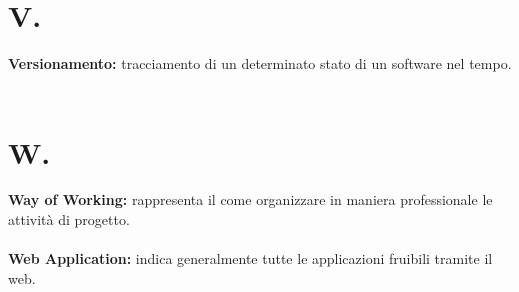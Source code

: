 \documentclass[a4paper, 12pt]{article}
\begin{document}
\section*{V.}
\textbf{Versionamento:} tracciamento di un determinato stato di un software nel tempo. \\ \\

\newpage
\section*{W.}
\textbf{Way of Working:} rappresenta il come organizzare in maniera professionale le attività di progetto.\\ \\
\textbf{Web Application:} indica generalmente tutte le applicazioni fruibili tramite il web.
\end{document}
